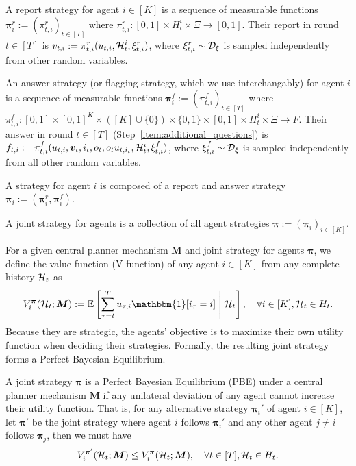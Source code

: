 \begin{definition}
\label{def:agent_strat_mechanism}
    A {report strategy} for agent $i\in[K]$ is a sequence of measurable functions $\bm\pi_i^r:=(\pi^r_{t,i})_{t\in[T]}$ where $\pi^r_{t,i}:[0,1]\times H_t^i\times \Xi \to [0,1]$. Their report in round $t\in[T]$ is $v_{t,i}:=\pi^r_{t,i}(u_{t,i},\mathcal{H}_t^i,\xi^r_{t,i})$, where $\xi^r_{t,i}\sim\mathcal{D}_\xi$ is sampled independently from other random variables.

    An {answer strategy} (or flagging strategy, which we use interchangably) for agent $i$ is a sequence of measurable functions $\bm\pi^f_i:=(\pi^f_{t,i})_{t\in[T]}$ where $\pi^f_{t,i}:[0,1]\times [0,1]^K\times ([K]\cup\{0\})\times \{0,1\}\times [0,1]\times H_t^i\times \Xi \to F$. Their answer in round $t\in[T]$ (Step~\ref{item:additional_questions}) is $f_{t,i}:=\pi^f_{t,i}(u_{t,i},\bm v_t,i_t,o_t,o_t u_{t,i_t}, \mathcal{H}_t^i,\xi^f_{t,i})$, where $\xi^f_{t,i}\sim\mathcal{D}_\xi$ is sampled independently from all other random variables.

    A {strategy} for agent $i$ is composed of a report and answer strategy $\bm\pi_i:=(\bm\pi^r_i,\bm\pi_i^f)$.

    A {joint strategy} for agents is a collection of all agent strategies $\bm\pi:=(\bm \pi_{i})_{i\in[K]}$.
\end{definition}

For a given central planner mechanism $\bm M$ and joint strategy for agents $\bm\pi$, we define the value function (V-function) of any agent $i\in[K]$ from any complete history $\mathcal{H}_t$ as 
\begin{equation}\label{eq:V-func general}
V_i^{\bm \pi}(\mH_t;\bm M):=\E\left [\sum_{\tau=t}^T u_{\tau,i} \mathbbm{1}[i_{\tau}=i]\middle \vert \mH_t\right ],\quad \forall i\in [K], \mH_t\in H_t.
\end{equation}
Because they are strategic, the agents' objective is to maximize their own utility function when deciding their strategies. Formally, the resulting joint strategy forms a Perfect Bayesian Equilibrium.

\begin{definition}
A joint strategy $\bm \pi$ is a Perfect Bayesian Equilibrium (PBE) under a central planner mechanism $\bm M$ if any unilateral deviation of any agent cannot increase their utility function. That is, for any alternative strategy $\bm \pi_i'$ of agent $i\in [K]$, let $\bm \pi'$ be the joint strategy where agent $i$ follows $\bm \pi_i'$ and any other agent $j\ne i$ follows $\bm \pi_j$, then we must have
\begin{equation*}
V_i^{\bm \pi'}(\mathcal{H}_t;\bm M)\le 
V_i^{\bm \pi}(\mathcal{H}_t;\bm M),\quad \forall t\in[T],\mathcal{H}_t\in H_t.
\end{equation*}
\end{definition}


